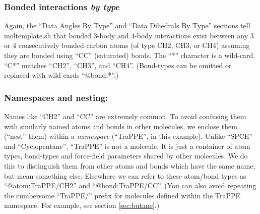 \documentclass[11pt]{article}
\begin{document}
\subsubsection*{Bonded interactions \textit{by type}}
Again, the ``Data Angles By Type'' and ``Data Dihedrals By Type'' sections 
tell moltemplate.sh that bonded 3-body and 4-body interactions exist between
any 3 or 4 consecutively bonded carbon atoms (of type CH2, CH3, or CH4)
assuming they are bonded using ``CC'' (saturated) bonds.
The ``*'' character is a wild-card.
``C*'' matches ``CH2'', ``CH3'', and ``CH4''.
(Bond-types can be omitted or replaced with wild-cards ``@bond:*''.)

%



\subsubsection*{Namespaces and nesting:}
Names like ``CH2'' and ``CC'' are extremely common.
To avoid confusing them with similarly named atoms and bonds 
in other molecules, we enclose them (``nest'' them) within a 
\textit{namespace} (``TraPPE'', in this example).
Unlike ``SPCE'' and ``Cyclopentane'', ``TraPPE'' is not a molecule.
It is just a container of atom types, bond-types and 
force-field parameters shared by other molecules.
We do this to distinguish them from other atoms and bonds 
which have the same name, but mean something else.
Elsewhere we can refer to these atom/bond types as
``@atom:TraPPE/CH2'' and ``@bond:TraPPE/CC''.
(You can also avoid repeating the cumbersome ``TraPPE/'' prefix 
 for molecules defined within the TraPPE namespace.
 For example, see section \ref{sec:butane}.)
\end{document}
